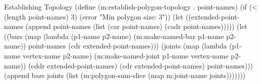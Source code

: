 \begin{code-listing}{Establishing Topology}
(define (m:establish-polygon-topology . point-names)
  (if (< (length point-names) 3)
      (error "Min polygon size: 3"))
  (let ((extended-point-names
         (append point-names
                 (list (car point-names) (cadr point-names)))))
    (let ((bars
           (map (lambda (p1-name p2-name)
                  (m:make-named-bar p1-name p2-name))
                point-names
                (cdr extended-point-names)))
          (joints
           (map (lambda (p1-name vertex-name p2-name)
                  (m:make-named-joint p1-name vertex-name p2-name))
                (cddr extended-point-names)
                (cdr extended-point-names)
                point-names)))
      (append bars joints
              (list (m:polygon-sum-slice
                     (map m:joint-name joints)))))))
\end{code-listing}
